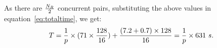 \documentclass{rspublic}
\newcommand{\alnote}[1]{ {\textcolor{blue} { ***andre: #1 }}}
\newcommand{\athotanote}[1]{ {\textcolor{green} { ***athota: #1 }}}
\newcommand{\alnote}[1]{}
\newcommand{\athotanote}[1]{}
\begin{document}





As there are $N_R \over 2$ concurrent pairs, substituting the above
values in equation~\ref{eq:totaltime}, we get:
\begin{eqnarray}
T=  {1 \over p} \times {{(71\times {128\over 16}}) + {(7.2+0.7)\times 128\over 16}} = {1 \over p} \times 631~s.
\label{eq:decent}
\end{eqnarray}



\end{document}
